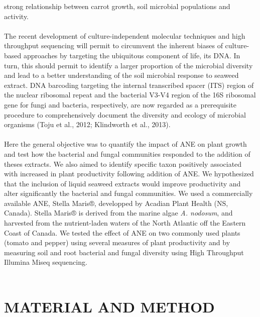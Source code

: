 \documentclass[11pt,]{article}
\begin{document}
strong relationship between carrot growth, soil microbial populations
and activity.\\
\hspace*{0.333em}\\
The recent development of culture-independent molecular techniques and
high throughput sequencing will permit to circumvent the inherent biases
of culture-based approaches by targeting the ubiquitous component of
life, its DNA. In turn, this should permit to identify a larger
proportion of the microbial diversity and lead to a better understanding
of the soil microbial response to seaweed extract. DNA barcoding
targeting the internal transcribed spacer (ITS) region of the nuclear
ribosomal repeat and the bacterial V3-V4 region of the 16S ribosomal
gene for fungi and bacteria, respectively, are now regarded as a
prerequisite procedure to comprehensively document the diversity and
ecology of microbial organisms (Toju et al., 2012; Klindworth et al.,
2013).\\
\hspace*{0.333em}\\
Here the general objective was to quantify the impact of ANE on plant
growth and test how the bacterial and fungal communities responded to
the addition of theses extracts. We also aimed to identify specific
taxon positively associated with increased in plant productivity
following addition of ANE. We hypothesized that the inclusion of liquid
seaweed extracts would improve productivity and alter significantly the
bacterial and fungal communities. We used a commercially available ANE,
Stella Maris®, developped by Acadian Plant Health (NS, Canada). Stella
Maris® is derived from the marine algae \emph{A. nodosum}, and harvested
from the nutrient-laden waters of the North Atlantic off the Eastern
Coast of Canada. We tested the effect of ANE on two commonly used plants
(tomato and pepper) using several measures of plant productivity and by
measuring soil and root bacterial and fungal diversity using High
Throughput Illumina Miseq sequencing.\\
\hspace*{0.333em}\\
\newpage  

\section{MATERIAL AND METHOD}\label{material-and-method}
\end{document}
